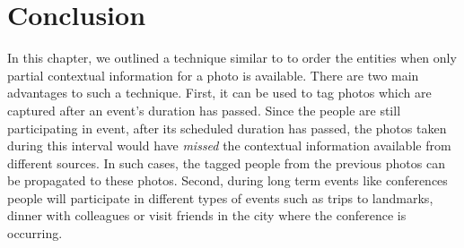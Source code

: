 



\section{Conclusion}
In this chapter, we outlined a technique similar to \cite{page1999pagerank} to order the entities when only partial contextual information for a photo is available. There are two main advantages to such a technique. First, it can be used to tag photos which are captured after an event's duration has passed. Since the people are still participating in event, after its scheduled duration has passed, the photos taken during this interval would have \textit{missed} the contextual information available from different sources. In such cases, the tagged people from the previous photos can be propagated to these photos. Second, during long term events like conferences people will participate in different types of events such as trips to landmarks, dinner with colleagues or visit friends in the city where the conference is occurring. 

